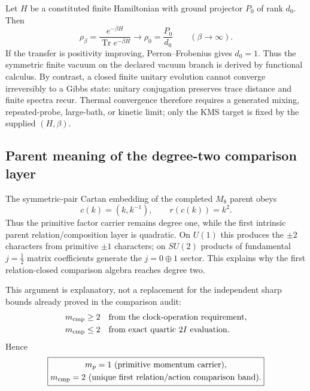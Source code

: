 \documentclass[12pt,a4paper]{article}
\begin{document}
\begin{theorem}
\label{p4:thm:v164-finite-gibbs-vacuum-no-thermalization}
Let \(H\) be a constituted finite Hamiltonian with ground projector \(P_0\)
of rank \(d_0\).  Then
\[
 \rho_\beta=\frac{e^{-\beta H}}{\operatorname{Tr}e^{-\beta H}}
 \longrightarrow \rho_0=\frac{P_0}{d_0}
 \qquad(\beta\to\infty).
\]
If the transfer is positivity improving, Perron--Frobenius gives \(d_0=1\).
Thus the symmetric finite vacuum on the declared vacuum branch is derived by
functional calculus.  By contrast, a closed finite unitary evolution cannot
converge irreversibly to a Gibbs state: unitary conjugation preserves trace
distance and finite spectra recur.  Thermal convergence therefore requires a
generated mixing, repeated-probe, large-bath, or kinetic limit; only the KMS
target is fixed by the supplied \((H,\beta)\).
\end{theorem}




\subsection{Parent meaning of the degree-two comparison layer}
\label{p4:sec:v187-cartan-square-comparison}
The symmetric-pair Cartan embedding of the completed $M_8$ parent obeys
\[
 c(k)=(k,k^{-1}),\qquad r(c(k))=k^2.
\]
Thus the primitive factor carrier remains degree one, while the first
intrinsic parent relation/composition layer is quadratic.  On $U(1)$ this
produces the $\pm2$ characters from primitive $\pm1$ characters; on $SU(2)$
products of fundamental $j=\frac12$ matrix coefficients generate the
$j=0\oplus1$ sector.  This explains why the first relation-closed comparison
algebra reaches degree two.

This argument is explanatory, not a replacement for the independent sharp
bounds already proved in the comparison audit:
\[
\begin{aligned}
 m_{\rm cmp}&\ge2 &&\text{from the clock-operation requirement},\\
 m_{\rm cmp}&\le2 &&\text{from exact quartic }2I\text{ evaluation}.
\end{aligned}
\]
Hence
\[
 \boxed{\begin{gathered}
 m_p=1\ \text{(primitive momentum carrier)},\\
 m_{\rm cmp}=2\ \text{(unique first relation/action comparison band)}.
 \end{gathered}}
\]
\end{document}
